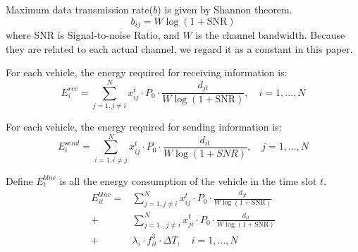 \documentclass[conference]{IEEEtran}
\begin{document}
	Maximum data transmission rate($b$) is given by Shannon theorem. 
	\begin{equation}
		b_{ij} = W\log (1 + \text{SNR})
	\end{equation}
	where SNR is Signal-to-noise Ratio, and $W$ is the channel bandwidth. Because they are related to each actual channel, we regard it as a constant in this paper. 
	
	For each vehicle, the energy required for receiving information is:
	\begin{equation}
		E_{i}^{r e c}=\sum_{j =1, j \ne i}^{N} x _{ij}^{t} \cdot P_0 \cdot \frac{d_{jt}}{W\log (1 + \text{SNR})}, 
		\quad  i = 1, \dots ,N
	\end{equation}
	
	For each vehicle, the energy required for sending information is:
	\begin{equation}
		E_{i}^{send}=\sum_{i =1, i \ne j}^{N} x _{ij}^{t} \cdot P_0 \cdot \frac{d_{it}}{W\log (1 + SNR)},
		\quad  j = 1, \dots ,N
	\end{equation}    
	
	Define $E^{blnc}_ {t} $ is all the energy consumption of the vehicle in the time slot $t$. 
	\begin{equation}
		\begin{aligned}
			E^{blnc} _{it}=
			&\sum_{j=1, j \ne i}^{N} x _{ij}^{t} \cdot P_0 \cdot \frac{d_{jt}}{W\log (1 + \text{SNR})}   \\
			+ &\sum_{j=1, , j \ne i}^{N} x _{ji}^{t} \cdot P_0 \cdot \frac{d_{it}}{W\log (1 + \text{SNR})}   \\
			+ &  \lambda_{i} \cdot f_{it}^{3} \cdot \Delta T
			, \quad i = 1, \dots ,N	
		\end{aligned}
	\end{equation}
	
\end{document}
